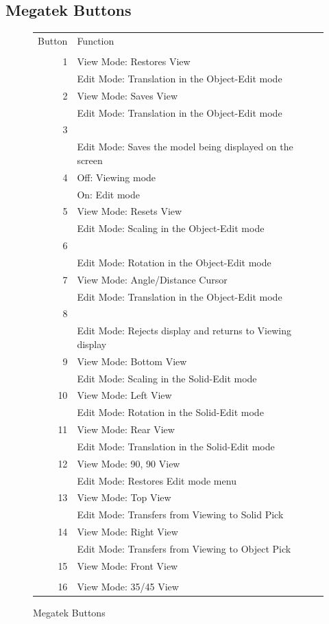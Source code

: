 \subsection{Megatek Buttons}

\begin{figure}[tbp]
\begin{tabular}{rl}
Button  & Function\\
 \\
1       & View Mode:  Restores View \\
        & Edit Mode:  Translation in the Object-Edit mode \\
2       & View Mode:  Saves View \\
        & Edit Mode:  Translation in the Object-Edit mode \\
3 \\
        & Edit Mode:  Saves the model being displayed on the screen \\
4       & Off:        Viewing mode \\
        & On:         Edit mode \\
5       & View Mode:  Resets View \\
        & Edit Mode:  Scaling in the Object-Edit mode \\
6 \\
        & Edit Mode:  Rotation in the Object-Edit mode \\
7       & View Mode:  Angle/Distance Cursor \\
        & Edit Mode:  Translation in the Object-Edit mode \\
8 \\
        & Edit Mode:  Rejects display and returns to Viewing display \\
9       & View Mode:  Bottom View \\
        & Edit Mode:  Scaling in the Solid-Edit mode \\
10      & View Mode:  Left View \\
        & Edit Mode:  Rotation in the Solid-Edit mode \\
11      & View Mode:  Rear View \\
        & Edit Mode:  Translation in the Solid-Edit mode \\
12      & View Mode:  90, 90 View \\
        & Edit Mode:  Restores Edit mode menu \\
13      & View Mode:  Top View \\
        & Edit Mode:  Transfers from Viewing to Solid Pick \\
14      & View Mode:  Right View \\
        & Edit Mode:  Transfers from Viewing to Object Pick \\
15      & View Mode:  Front View \\
 \\
16      & View Mode:  35/45 View
\end{tabular}
\caption{Megatek Buttons \label{mg-button-table} }
\end{figure}

